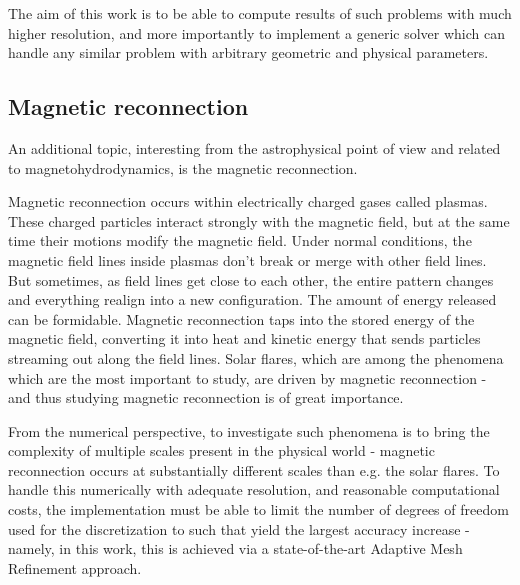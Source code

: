 The aim of this work is to be able to compute results of such problems with much higher resolution, and more importantly to implement a generic solver which can handle any similar problem with arbitrary geometric and physical parameters.

\subsection{Magnetic reconnection}
An additional topic, interesting from the astrophysical point of view and related to magnetohydrodynamics, is the magnetic reconnection.

Magnetic reconnection occurs within electrically charged gases called plasmas. These charged particles interact strongly with the magnetic field, but at the same time their motions modify the magnetic field. Under normal conditions, the magnetic field lines inside plasmas don't break or merge with other field lines. But sometimes, as field lines get close to each other, the entire pattern changes and everything realign into a new configuration. The amount of energy released can be formidable. Magnetic reconnection taps into the stored energy of the magnetic field, converting it into heat and kinetic energy that sends particles streaming out along the field lines. Solar flares, which are among the phenomena which are the most important to study, are driven by magnetic reconnection - and thus studying magnetic reconnection is of great importance.

From the numerical perspective, to investigate such phenomena is to bring the complexity of multiple scales present in the physical world - magnetic reconnection occurs at substantially different scales than e.g. the solar flares. To handle this numerically with adequate resolution, and reasonable computational costs, the implementation must be able to limit the number of degrees of freedom used for the discretization to such that yield the largest accuracy increase - namely, in this work, this is achieved via a state-of-the-art Adaptive Mesh Refinement approach.
